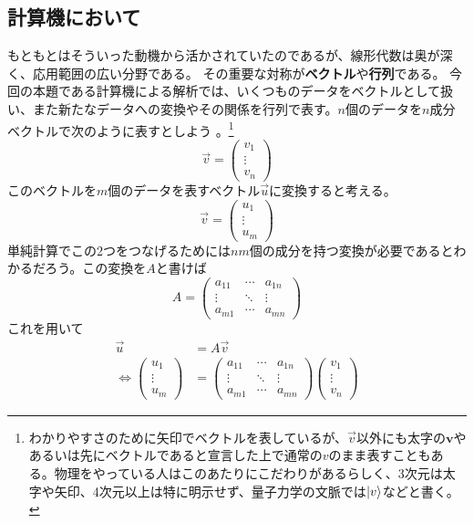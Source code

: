 \documentclass[10pt]{jsreport}
\theoremstyle{definition}%
\newcommand{\vc}[1]{\overrightarrow{#1}}%
\newcommand{\vct}[1]{\bm{#1}}%
\numberwithin{equation}{section}%
\begin{document}
\subsection{計算機において}
もともとはそういった動機から活かされていたのであるが、線形代数は奥が深く、応用範囲の広い分野である。
その重要な対称が{\bf ベクトル}や{\bf 行列}である。
今回の本題である計算機による解析では、いくつものデータをベクトルとして扱い、また新たなデータへの変換やその関係を行列で表す。$n$個のデータを$n$成分ベクトルで次のように表すとしよう
。\footnote{わかりやすさのために矢印でベクトルを表しているが、$\vc{v}$以外にも太字の$\vct{v}$やあるいは先にベクトルであると宣言した上で通常の$v$のまま表すこともある。物理をやっている人はこのあたりにこだわりがあるらしく、3次元は太字や矢印、4次元以上は特に明示せず、量子力学の文脈では$\ket{v}$などと書く。}
\begin{equation}
  \vc{v}=\left( \begin{matrix}
    v_{1}\\
    \vdots \\
    v_{n}
  \end{matrix} \right)
\end{equation}
このベクトルを$m$個のデータを表すベクトル$\vc{u}$に変換すると考える。
\begin{equation}
  \vc{v}=\left( \begin{matrix}
    u_{1}\\
    \vdots \\
    u_{m}
  \end{matrix} \right)
\end{equation}
単純計算でこの2つをつなげるためには$nm$個の成分を持つ変換が必要であるとわかるだろう。この変換を$A$と書けば
\begin{equation}
  A=\left( \begin{matrix}
    a_{11} & \cdots & a_{1n} \\
    \vdots & \ddots & \vdots \\
    a_{m1} & \cdots & a_{mn}
  \end{matrix} \right)
\end{equation}
これを用いて
\begin{align}
  \vc{u} &= A \vc{v}\\
 \Leftrightarrow  \left( \begin{matrix}
    u_{1}\\
    \vdots \\
    u_{m}
  \end{matrix} \right)&=\left( \begin{matrix}
    a_{11} & \cdots & a_{1n} \\
    \vdots & \ddots & \vdots \\
    a_{m1} & \cdots & a_{mn}
  \end{matrix} \right)\left( \begin{matrix}
    v_{1}\\
    \vdots \\
    v_{n}
  \end{matrix} \right)
\end{align}
\end{document}

